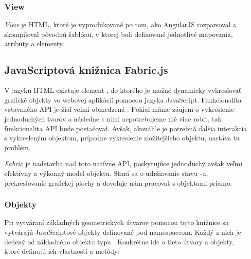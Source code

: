 \subsubsection{View}
\textit{View} je HTML, ktoré je vyprodukované po tom, ako AngularJS rozparsoval a skompiloval pôvodnú šablónu, v ktorej boli definované jednotlivé mapovania, atribúty a elementy.

\subsection{JavaScriptová knižnica Fabric.js}

V jazyku HTML existuje element , do ktorého je možné dynamicky vykresľovať grafické objekty vo webovej aplikácií pomocou jazyka JavaScript. Funkcionalita vstavaného API je žiaľ veľmi obmedzená \cite{cabanier2014html}. Pokiaľ máme záujem o vykreslenie jednoduchých tvarov a následne s nimi nepotrebujeme nič viac robiť, tak funkcionalita API bude postačovať. Avšak, akonáhle je potrebná ďalšia interakcia s vykresleným objektom, prípadne vykreslenie zložitejšieho objektu, nastáva tu problém.

\textit{Fabric} je nadstavba nad toto natívne API, poskytujúce jednoduchý avšak veľmi efektívny a výkonný model objektu. Stará sa o udržiavanie stavu -u, prekresľovanie grafickej plochy a dovoľuje nám pracovať s objektami priamo.

\subsubsection{Objekty}

Pri vytváraní základných geometrických útvarov pomocou tejto knižnice sa vytvárajú JavaScriptové objekty definované pod  namespaceom. Každý z nich je dedený od základného  objektu typu . Konkrétne ide o tieto útvary a objekty, ktoré definujú ich vlastnosti a metódy:

